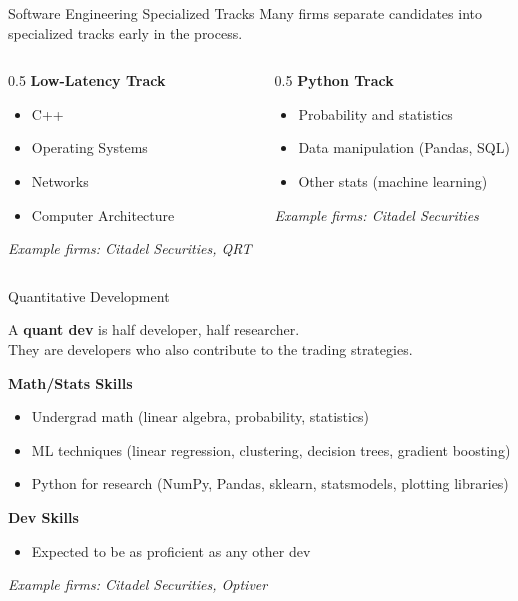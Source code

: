 \begin{frame}{Software Engineering Specialized Tracks}
  Many firms separate candidates into specialized tracks early in the process.

  \vspace{0.3cm}
  \begin{columns}[T]
    \begin{column}{0.5\textwidth}
      \textbf{Low-Latency Track}
      \begin{itemize}
        \item C++
        \item Operating Systems
        \item Networks
        \item Computer Architecture
      \end{itemize}
      \textit{Example firms: Citadel Securities, QRT}
    \end{column}
    \begin{column}{0.5\textwidth}
      \textbf{Python Track}
      \begin{itemize}
        \item Probability and statistics
        \item Data manipulation (Pandas, SQL)
        \item Other stats (machine learning)
      \end{itemize}
      \textit{Example firms: Citadel Securities}
    \end{column}
  \end{columns}
\end{frame}

\begin{frame}{Quantitative Development}

  \begin{sqt:definition}
    A \textbf{quant dev} is half developer, half researcher.\\
    They are developers who also contribute to the trading strategies.
  \end{sqt:definition}

  \vspace{0.3cm}
  \textbf{Math/Stats Skills}
  \begin{itemize}
    \item Undergrad math (linear algebra, probability, statistics)
    \item ML techniques (linear regression, clustering, decision trees, gradient boosting)
    \item Python for research (NumPy, Pandas, sklearn, statsmodels, plotting libraries)
  \end{itemize}

  \vspace{0.3cm}
  \textbf{Dev Skills}
  \begin{itemize}
    \item Expected to be as proficient as any other dev
  \end{itemize}

  \vspace{0.3cm}
  \textit{Example firms: Citadel Securities, Optiver}
\end{frame}
